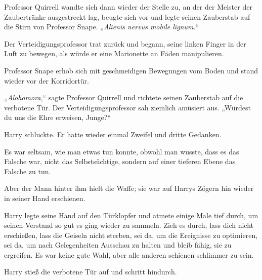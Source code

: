 Professor Quirrell wandte sich dann wieder der Stelle zu, an der der Meister der Zaubertränke ausgestreckt lag, beugte sich vor und legte seinen Zauberstab auf die Stirn von Professor Snape. „\emph{Alienis nervus mobile lignum.}“

Der Verteidigungsprofessor trat zurück und begann, seine linken Finger in der Luft zu bewegen, als würde er eine Marionette an Fäden manipulieren.

Professor Snape erhob sich mit geschmeidigen Bewegungen vom Boden und stand wieder vor der Korridortür.

„\emph{Alohomora},“ sagte Professor Quirrell und richtete seinen Zauberstab auf die verbotene Tür.
Der Verteidigungsprofessor sah ziemlich amüsiert aus.
„Würdest du uns die Ehre erweisen, Junge?“

Harry schluckte. Er hatte wieder einmal Zweifel und dritte Gedanken.

Es war seltsam, wie man etwas tun konnte, obwohl man wusste, dass es das Falsche war, nicht das Selbstsüchtige, sondern auf einer tieferen Ebene das Falsche zu tun.

Aber der Mann hinter ihm hielt die Waffe; sie war auf Harrys Zögern hin wieder in seiner Hand erschienen.

Harry legte seine Hand auf den Türklopfer und atmete einige Male tief durch, um seinen Verstand so gut es ging wieder zu sammeln.
Zieh es durch, lass dich nicht erschießen, lass die Geiseln nicht sterben, sei da, um die Ereignisse zu optimieren, sei da, um nach Gelegenheiten Ausschau zu halten und bleib fähig, sie zu ergreifen.
Es war keine gute Wahl, aber alle anderen schienen schlimmer zu sein.

Harry stieß die verbotene Tür auf und schritt hindurch.

